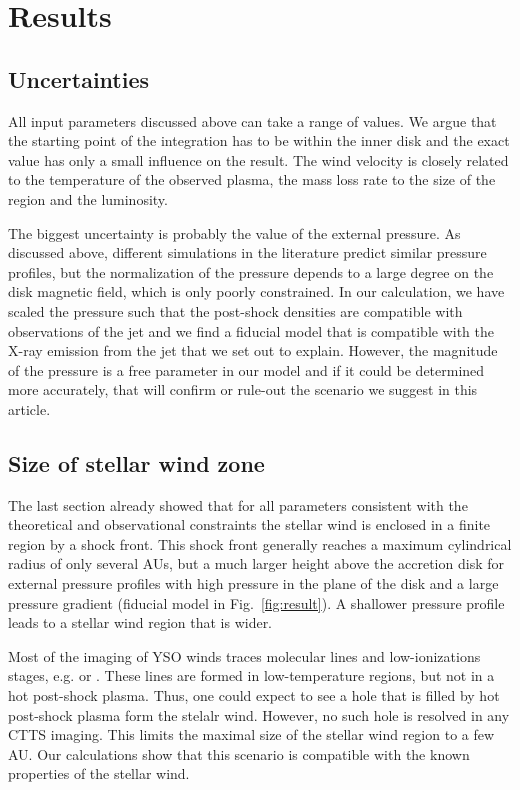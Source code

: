 \section{Results}
\label{sect:results}

\subsection{Uncertainties}
All input parameters discussed above can take a range of values. We argue that the starting point of the integration has to be within the inner disk and the exact value has only a small influence on the result. The wind velocity is closely related to the temperature of the observed plasma, the mass loss rate to the size of the region and the luminosity.

The biggest uncertainty is probably the value of the external pressure. As discussed above, different simulations in the literature predict similar pressure profiles, but the normalization of the pressure depends to a large degree on the disk magnetic field, which is only poorly constrained. In our calculation, we have scaled the pressure such that the post-shock densities are compatible with observations of the jet and we find a fiducial model that is compatible with the X-ray emission from the jet that we set out to explain. However, the magnitude of the pressure is a free parameter in our model and if it could be determined more accurately, that will confirm or rule-out the scenario we suggest in this article.


\subsection{Size of stellar wind zone}
The last section already showed that for all parameters consistent with the theoretical and observational constraints the stellar wind is enclosed in a finite region by a shock front. This shock front generally reaches a maximum cylindrical radius of only several AUs, but a much larger height above the accretion disk for external pressure profiles with high pressure in the plane of the disk and a large pressure gradient (fiducial model in Fig.~\ref{fig:result}). A shallower pressure profile leads to a stellar wind region that is wider. 

Most of the imaging of YSO winds traces molecular lines and low-ionizations stages, e.g.  or . These lines are formed in low-temperature regions, but not in a hot post-shock plasma. Thus, one could expect to see a hole that is filled by hot post-shock plasma form the stelalr wind. However, no such hole is resolved in any CTTS imaging. This limits the maximal size of the stellar wind region to a few AU. Our calculations show that this scenario is compatible with the known properties of the stellar wind. 

